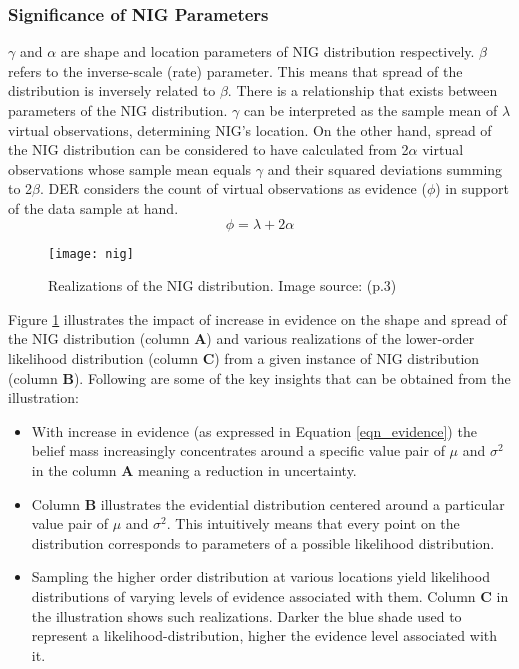 	\subsubsection{Significance of NIG Parameters}\label{sec_nig_param}
	$\gamma$  and $\alpha$ are shape and location parameters of NIG distribution respectively. $\beta$ refers to the inverse-scale (rate) parameter. This means that spread of the distribution is inversely related to $\beta$. There is a relationship that exists between parameters of the NIG distribution. $\gamma$ can be interpreted as the sample mean of $\lambda$ virtual observations, determining NIG's location. On the other hand, spread of the NIG distribution  can be considered to have calculated from 2$\alpha$ virtual observations whose sample mean equals $\gamma$ and their squared deviations summing to 2$\beta$. DER considers the count of virtual observations as evidence ($\phi$) in support of the data sample at hand.   
	\begin{equation}\label{eqn_evidence}
		\phi = \lambda + 2\alpha
	\end{equation}
	\begin{figure}[H]
		\texttt{[image: nig]}
		\caption[Realizations of the NIG distribution]{Realizations of the NIG distribution.  Image source: \cite{amini2020deep}(p.3) }
		\label{fig_nig_realization}
	\end{figure}
	Figure \ref{fig_nig_realization} illustrates the impact of increase in evidence on the shape and spread of the NIG distribution (column \textbf{A}) and various realizations of the lower-order likelihood distribution (column \textbf{C}) from a given instance of NIG distribution (column \textbf{B}). Following are some of the key insights that can be obtained from the illustration:
	\begin{itemize}
		\item With increase in evidence (as expressed in Equation \ref{eqn_evidence}) the belief mass increasingly concentrates around a specific value pair of $\mu$ and $\sigma^2$ in the column \textbf{A} meaning a reduction in uncertainty.
		\item Column \textbf{B} illustrates the evidential distribution  centered around a particular value pair of $\mu$ and $\sigma^2$. This intuitively means that every point on the distribution corresponds to parameters of a possible likelihood distribution. 
		\item  Sampling the higher order distribution at various locations yield likelihood distributions of varying levels of evidence associated with them. Column \textbf{C} in the illustration shows such realizations. Darker the blue shade used to represent a likelihood-distribution, higher the evidence level associated with it.  
	\end{itemize}
